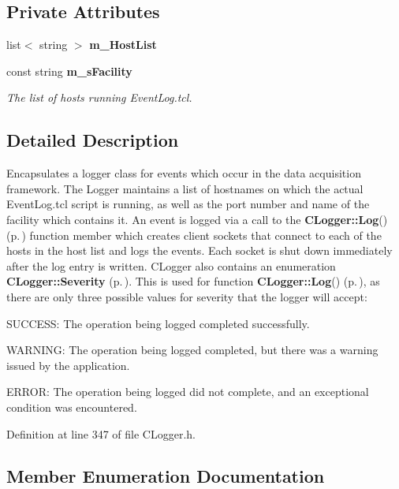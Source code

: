 \subsection*{Private Attributes}
\begin{CompactItemize}
\item 
list$<$ string $>$ {\bf m\_\-Host\-List}
\item 
const string {\bf m\_\-s\-Facility}
\begin{CompactList}\small\item\em The list of hosts running Event\-Log.tcl.\item\end{CompactList}\end{CompactItemize}


\subsection{Detailed Description}
Encapsulates a logger class for events which occur in the data acquisition framework.  The Logger maintains a list of hostnames on which the actual Event\-Log.tcl script is running, as well as the port number and name of the facility which contains it. An event is logged via a call to the {\bf CLogger::Log}() {\rm (p.\,\pageref{classCLogger_a3})} function member which creates  client sockets that connect to each of the hosts in the host list and logs the events. Each socket is shut down immediately  after the log entry is written. CLogger also contains an enumeration {\bf CLogger::Severity} {\rm (p.\,\pageref{classCLogger_s3})}. This is used for function {\bf CLogger::Log}() {\rm (p.\,\pageref{classCLogger_a3})}, as there are only three possible values for severity that the logger will accept:

\begin{CompactItemize}
\item 
SUCCESS: The operation being logged completed successfully.\item 
WARNING: The operation being logged completed, but there was a warning issued by the application.\item 
ERROR: The operation being logged did not complete, and an exceptional condition was encountered. \end{CompactItemize}




Definition at line 347 of file CLogger.h.

\subsection{Member Enumeration Documentation}
